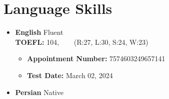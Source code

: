 \documentclass[11pt,a4paper, sans]{moderncv}
\begin{document}


\section{Language Skills}
\begin{itemize}
	\item \textbf{English} \hspace{6 pt} Fluent
	\\\textbf{ \hspace{3 pt} TOEFL:}  104, ~~~ \small (R:27, L:30, S:24, W:23)
	\begin{itemize}
	\item \textbf{ \hspace{6 pt} Appointment Number:}  7574603249657141
	\item \textbf{ \hspace{6 pt} Test Date: }  March 02, 2024 
	\end{itemize} 
	\vspace{5pt}
	\normalsize 
	\item \textbf{Persian} \hspace{5 pt} Native
\end{itemize} 
\end{document}
